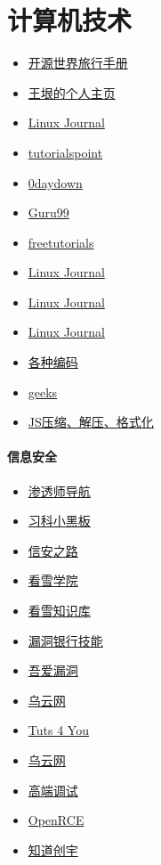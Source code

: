 
\section{计算机技术}
\begin{itemize}
	\item \href{http://i.linuxtoy.org/docs/guide/}{开源世界旅行手册}
	\item \href{http://www.ctex.org/documents/shredder/index.html}{王垠的个人主页}
	\item \href{http://www.linuxjournal.com/}{Linux Journal}
	\item \href{https://www.tutorialspoint.com/index.htm}{tutorialspoint}
	\item \href{http://www.0daydown.com/}{0daydown}
	\item \href{https://www.guru99.com/}{Guru99}
	\item \href{https://www.freetutorials.us/}{freetutorials}
	\item \href{http://www.linuxjournal.com/}{Linux Journal}
	\item \href{http://www.linuxjournal.com/}{Linux Journal}
	\item \href{http://www.linuxjournal.com/}{Linux Journal}
	\item \href{http://ctf.ssleye.com/}{各种编码}
	\item \href{https://www.geeksforgeeks.org/}{geeks}
	\item \href{https://www.css-js.com/}{JS压缩、解压、格式化}

\end{itemize}
\paragraph{信息安全}
\begin{itemize}
	\item \href{http://www.shentoushi.top/}{渗透师导航}
	\item \href{https://silic.wiki/}{习科小黑板}
	\item \href{http://www.myh0st.cn/}{信安之路}
	\item \href{https://www.pediy.com/}{看雪学院}
	\item \href{https://www.kanxue.com/chm.htm}{看雪知识库}
	\item \href{https://skills.bugbank.cn/}{漏洞银行技能}
	\item \href{http://www.52bug.cn/}{吾爱漏洞}
	\item \href{http://www.wooyun.org/}{乌云网}
	\item \href{https://tuts4you.com/}{Tuts 4 You}
	\item \href{http://www.wooyun.org/}{乌云网}
	\item \href{http://advdbg.org/}{高端调试}
	\item \href{http://www.openrce.org/articles/}{OpenRCE}
	\item \href{http://blog.knownsec.com/}{知道创宇}
\end{itemize}